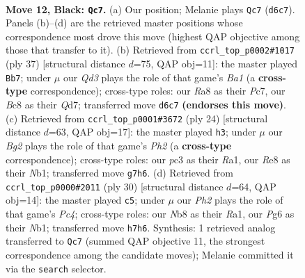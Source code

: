\documentclass[11pt]{article}
\begin{document}
\clearpage

\begin{figure}[p]\centering
\begin{subfigure}{0.46\textwidth}\centering
\resizebox{\linewidth}{!}{%
\newchessgame
\chessboard[
  setfen={rnb1r1k1/pp3pbp/3q2p1/2pPp1B1/2B1P3/2P5/P4PPP/R1Q1K1NR b - - 1 12},
  showmover=false,
  pgfstyle=straightmove, color=movearrow, markmove={d6-c7}
]}
\caption{}
\end{subfigure}\hfill
\begin{subfigure}{0.46\textwidth}\centering
\resizebox{\linewidth}{!}{%
\newchessgame
\chessboard[
  setfen={b4rk1/2pq1ppp/3p1b2/1p1Pp3/nP6/3P3P/B1PB1PPN/3QR1K1 b - - 2 19},
  showmover=false,
  pgfstyle=straightmove, color=movearrow, markmove={a8-b7}
]}
\caption{}
\end{subfigure}
\\[4pt]
\begin{subfigure}{0.46\textwidth}\centering
\resizebox{\linewidth}{!}{%
\newchessgame
\chessboard[
  setfen={r3k2r/1pqn1ppp/p1pbp3/7b/P1BP4/1Q2P3/1P1B1PPP/RN3RK1 w kq - 1 13},
  showmover=false,
  pgfstyle=straightmove, color=movearrow, markmove={h2-h3}
]}
\caption{}
\end{subfigure}\hfill
\begin{subfigure}{0.46\textwidth}\centering
\resizebox{\linewidth}{!}{%
\newchessgame
\chessboard[
  setfen={r1b1qrk1/p5pp/1pp1pp2/8/1bPPpB2/6P1/PPQ1PP1P/RN1R2K1 w - - 2 16},
  showmover=false,
  pgfstyle=straightmove, color=movearrow, markmove={c4-c5}
]}
\caption{}
\end{subfigure}
\caption{\textbf{Move 12, Black: \texttt{Qc7}.} (a) Our position; Melanie plays \texttt{Qc7} (\texttt{d6c7}). Panels (b)--(d) are the retrieved master positions whose correspondence most drove this move (highest QAP objective among those that transfer to it). (b) Retrieved from \texttt{ccrl\_top\_p0002\#1017} (ply 37) [structural distance $d$=75, QAP obj=11]: the master played \texttt{Bb7}; under $\mu$ our \emph{Qd3} plays the role of that game's \emph{Ba1} (a \textbf{cross-type} correspondence); cross-type roles: our \emph{R}a8 as their \emph{P}c7, our \emph{B}c8 as their \emph{Q}d7; transferred move \texttt{d6c7} \textbf{(endorses this move)}. (c) Retrieved from \texttt{ccrl\_top\_p0001\#3672} (ply 24) [structural distance $d$=63, QAP obj=17]: the master played \texttt{h3}; under $\mu$ our \emph{Bg2} plays the role of that game's \emph{Ph2} (a \textbf{cross-type} correspondence); cross-type roles: our \emph{p}c3 as their \emph{R}a1, our \emph{R}e8 as their \emph{N}b1; transferred move \texttt{g7h6}. (d) Retrieved from \texttt{ccrl\_top\_p0000\#2011} (ply 30) [structural distance $d$=64, QAP obj=14]: the master played \texttt{c5}; under $\mu$ our \emph{Ph2} plays the role of that game's \emph{Pc4}; cross-type roles: our \emph{N}b8 as their \emph{R}a1, our \emph{P}g6 as their \emph{N}b1; transferred move \texttt{h7h6}. Synthesis: 1 retrieved analog transferred to \texttt{Qc7} (summed QAP objective 11, the strongest correspondence among the candidate moves); Melanie committed it via the \texttt{search} selector.}
\label{fig:thought-m23}
\end{figure}
\end{document}
